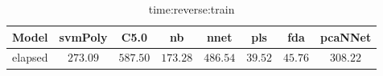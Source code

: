 \begin{table}[!ht]
	\centering
	\begin{tabular}{|c|c|c|c|c|c|c|c|}
		\hline
		Model & svmPoly & C5.0 & nb & nnet & pls & fda & pcaNNet \\ \hline
		elapsed & $273.09$ & $587.50$ & $173.28$ & $486.54$ & $39.52$ & $45.76$ & $308.22$ \\ \hline
	\end{tabular}
	\caption{time:reverse:train}
	\label{tab:time:reverse:train}
\end{table}
